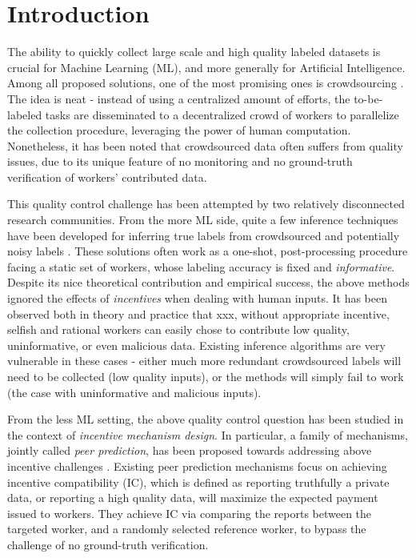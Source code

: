 \section{Introduction}
The ability to quickly collect large scale and high quality labeled datasets is crucial for Machine Learning (ML), and more generally for Artificial Intelligence. Among all proposed solutions, one of the most promising ones is crowdsourcing \cite{slivkins2014online,difallah2015dynamics,simpson2015language}. The idea is neat - instead of using a centralized amount of efforts, the to-be-labeled tasks are disseminated to a decentralized crowd of workers to parallelize the collection procedure, leveraging the power of human computation. Nonetheless, it has been noted that crowdsourced data often suffers from quality issues, due to its unique feature of no monitoring and no ground-truth verification of workers' contributed data. %

This quality control challenge has been attempted by two relatively disconnected research communities. From the more ML side, quite a few inference techniques have been developed for inferring true labels from crowdsourced and potentially noisy labels \cite{dawid1979maximum,raykar2010learning,liu2012variational,chen2015statistical,zheng2017truth}. These solutions often work as a one-shot, post-processing procedure facing a static set of workers, whose labeling accuracy is fixed and \emph{informative}. Despite its nice theoretical contribution and empirical success, the above methods ignored the effects of \emph{incentives} when dealing with human inputs. It has been observed both in theory and practice that {\color{red} xxx\cite{liu2017sequential}}, without appropriate incentive, selfish and rational workers can easily chose to contribute low quality, uninformative, or even malicious data. Existing inference algorithms are very vulnerable in these cases - either much more redundant crowdsourced labels will need to be collected (low quality inputs), or the methods will simply fail to work (the case with uninformative and malicious inputs). 

From the less ML setting, the above quality control question has been studied in the context of \emph{incentive mechanism design}. In particular, a family of mechanisms, jointly called \emph{peer prediction}, has been proposed towards addressing above incentive challenges \cite{prelec2004bayesian,gneiting2007strictly,jurca2009mechanisms,witkowski2012peer,radanovic2013robust,dasgupta2013crowdsourced}. Existing peer prediction mechanisms focus on achieving incentive compatibility (IC), which is defined as reporting truthfully a private data, or reporting a high quality data, will maximize the expected payment issued to workers. They achieve IC via comparing the reports between the targeted worker, and a randomly selected reference worker, to bypass the challenge of no ground-truth verification.


